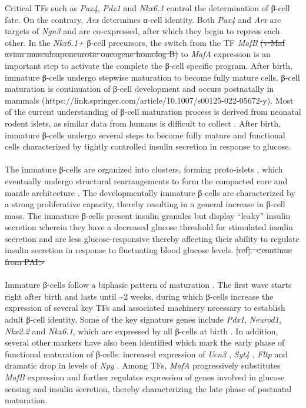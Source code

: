 Critical TFs such as \textit{Pax4}, \textit{Pdx1} and \textit{Nkx6.1} control the determination of β-cell fate. On the contrary, \textit{Arx} determines α-cell identity. Both \textit{Pax4} and \textit{Arx} are targets of \textit{Ngn3} and are co-expressed, after which they begin to repress each other. In the \textit{Nkx6.1+} β-cell precursors, the switch from the TF \textit{MafB} \st{(v-Maf avian musculoaponeurotic oncogene homolog B)} to \textit{MafA} expression is an important step to activate the complete the β-cell specific program. After birth, immature β-cells undergo stepwise maturation to become fully mature cells. β-cell maturation is continuation of β-cell development and occurs postnatally in mammals (https://link.springer.com/article/10.1007/s00125-022-05672-y). Most of the current understanding of β-cell maturation process is derived from neonatal rodent islets, as similar data from humans is difficult to collect \textbf{\cite{liu_all_2017, salinno_-cell_2019}}. After birth, immature β-cells undergo several steps to become fully mature and functional cells characterized by tightly controlled insulin secretion in response to glucose.
\\\\
The immature β-cells are organized into clusters, forming proto-islets \textbf{\cite{salinno_-cell_2019}}, which eventually undergo structural rearrangements to form the compacted core and mantle architecture \textbf{\cite{sharon_peninsular_2019}}. The developmentally immature β-cells are characterized by a strong proliferative capacity, thereby resulting in a general increase in β-cell mass. The immature β-cells present insulin granules but display “leaky” insulin secretion wherein they have a decreased glucose threshold for stimulated insulin secretion \textbf{\cite{liu_all_2017, blum_functional_2012}} and are less glucose-responsive thereby affecting their ability to regulate insulin secretion in response to fluctuating blood glucose levels. \st{[ref]. <continue from PAI>}
\\\\
Immature β-cells follow a biphasic pattern of maturation \textbf{\cite{salinno_-cell_2019, stolovich-rain_weaning_2015}}.  The first wave starts right after birth and lasts until \textasciitilde 2 weeks, during which β-cells increase the expression of several key TFs and associated machinery necessary to establish adult β-cell identity. Some of the key signature genes include \textit{Pdx1}, \textit{Neurod1}, \textit{Nkx2.2} and \textit{Nkx6.1}, which are expressed by all β-cells at birth \textbf{\cite{salinno_-cell_2019}}. In addition, several other markers have also been identified which mark the early phase of functional maturation of β-cells: increased expression of \textit{Ucn3} \textbf{\cite{salinno_-cell_2019, blum_functional_2012}}, \textit{Syt4} \textbf{\cite{salinno_-cell_2019, huang_synaptotagmin_2018}}, \textit{Fltp} \textbf{\cite{salinno_-cell_2019, bader_identification_2016}}  and dramatic drop in levels of \textit{Npy} \textbf{\cite{salinno_-cell_2019, rodnoi_neuropeptide_2017}}. Among TFs, \textit{MafA} progressively substitutes \textit{MafB} expression and further regulates expression of genes involved in glucose sensing and insulin secretion, thereby characterizing the late phase of postnatal maturation.
